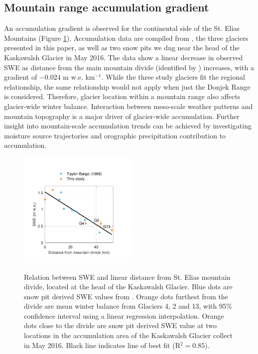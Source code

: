 \documentclass[review,oneside, letterpaper]{igs}
\begin{document}
\subsection{Mountain range accumulation gradient}

An accumulation gradient is observed for the continental side of the St. Elias Mountains (Figure \ref{fig:AccumGrad}). Accumulation data are compiled from \cite{Taylor1969}, the three glaciers presented in this paper, as well as two snow pits we dug near the head of the Kaskawalsh Glacier in May 2016. The data show a linear decrease in observed SWE as distance from the main mountain divide (identified by \cite{Taylor1969}) increases, with a gradient of $-0.024$ m w.e. km$^{-1}$. While the three study glaciers fit the regional relationship, the same relationship would not apply when just the Donjek Range is considered. Therefore, glacier location within a mountain range also affects glacier-wide winter balance. Interaction between meso-scale weather patterns and mountain topography is a major driver of glacier-wide accumulation. Further insight into mountain-scale accumulation trends can be achieved by investigating moisture source trajectories and orographic precipitation contribution to accumulation. 

\begin{figure}
	\centering
	\includegraphics[width =0.5\textwidth]{AccumGrad.pdf}\\
	\caption{Relation between SWE and linear distance from St. Elias mountain divide, located at the head of the Kaskawalsh Glacier. Blue dots are snow pit derived SWE values from \cite{Taylor1969}. Orange dots furthest from the divide are mean winter balance from Glaciers 4, 2 and 13, with 95\% confidence interval using a linear regression interpolation. Orange dots close to the divide are snow pit derived SWE value at two locations in the accumulation area of the Kaskawalsh Glacier collect in May 2016. Black line indicates line of best fit (R$^2=0.85$).}
	\label{fig:AccumGrad}
\end{figure}
\end{document}
